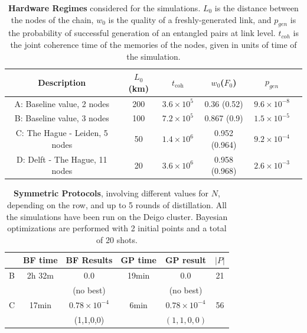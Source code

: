 \documentclass{article}
\begin{document}
\begin{table}[ht]
    \centering
    \begin{tabular}{|c|c|c|c|c|c|}
        \hline
        Description & $L_0$ (km) & $t_{\text{coh}}$ & $w_0$($F_0$) & $p_{gen}$ \\
        \hline
        \hline
        A: Baseline value, 2 nodes & 200  & $3.6 \times 10^5$ & 0.36 (0.52) & $9.6 \times 10^{-8}$ \\
        \hline
        B: Baseline value, 3 nodes & 100  & $7.2 \times 10^5$ & 0.867 (0.9) & $1.5 \times 10^{-5}$ \\
        \hline
        C: The Hague - Leiden, 5 nodes & 50  & $1.4 \times 10^6$ & 0.952 (0.964) & $9.2 \times 10^{-4}$ \\
        \hline
        D: Delft - The Hague, 11 nodes & 20  & $3.6 \times 10^6$ & 0.958 (0.968) & $2.6 \times 10^{-3}$ \\
        \hline
    \end{tabular}
    \caption{\textbf{Hardware Regimes} considered for the simulations. $L_0$ is the distance between the nodes of the chain, $w_0$ is the quality of a freshly-generated link, and $p_{gen}$ is the probability of successful generation of an entangled pairs at link level. $t_{coh}$ is the joint coherence time of the memories of the nodes, given in units of time of the simulation.}
    \label{tab:hardware_regimes}
\end{table}

\begin{table}[ht]
    \centering
    \begin{tabular}{|c|c|c|c|c|c|}
        \hline
        & BF time & BF Results & GP time & GP result & $|P|$ \\
        \hline
        \hline
        B & 2h 32m & 0.0 & 19min & 0.0 & 21 \\
        & & (no best) & & (no best) & \\
        \hline
        C & 17min & $0.78 \times 10^{-4}$ & 6min & $0.78 \times 10^{-4}$ & 56 \\
        & & (1,1,0,0) & & $(1,1,0,0)$ & \\
        \hline
    \end{tabular}
    \caption{\textbf{Symmetric Protocols}, involving different values for $N$, depending on the row, and up to 5 rounds of distillation. All the simulations have been run on the Deigo cluster. Bayesian optimizations are performed with 2 initial points and a total of 20 shots.}
    \label{tab:symmetric_protocols}
\end{table}
\end{document}
